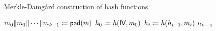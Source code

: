 \begin{algorithm}[t]
\caption{Merkle-Damg\r{a}rd construction of hash functions}
\label{alg:md_construction}
\begin{algorithmic}[1]
    \State $m_{0}\|m_{1}\|\cdots\|m_{k-1} \coloneqq{} \textsf{pad}(m)$
    \State $h_{0} \coloneqq{} h(\textsf{IV}, m_{0})$
        \State $h_{i} \coloneqq{} h(h_{i-1}, m_{i})$
    \EndFor
    \State \Return $h_{k-1}$
\EndProcedure
\end{algorithmic}
\end{algorithm}
